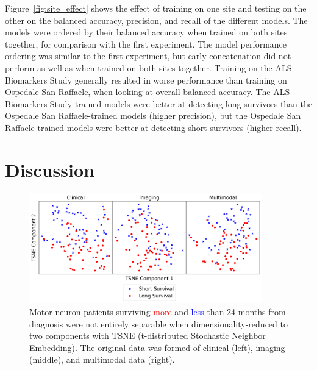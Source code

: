 Figure~\ref{fig:site_effect} shows the effect of training on one site and testing on the other on the balanced accuracy, precision, and recall of the different models.
The models were ordered by their balanced accuracy when trained on both sites together, for comparison with the first experiment.
The model performance ordering was similar to the first experiment, but early concatenation did not perform as well as when trained on both sites together.
Training on the ALS Biomarkers Study generally resulted in worse performance than training on Ospedale San Raffaele, when looking at overall balanced accuracy.
The ALS Biomarkers Study-trained models were better at detecting long survivors than the Ospedale San Raffaele-trained models (higher precision), but the Ospedale San Raffaele-trained models were better at detecting short survivors (higher recall).

\section{Discussion}

\begin{figure}
    \centering
    \includegraphics[width=0.9\textwidth]{figures/tsne_plot}
    \caption[Two-dimensional representation of the separation between long and short surviving motor neuron disease patients with clinical, imaging, and multimodal data.]{Motor neuron patients surviving \textcolor{red}{more} and \textcolor{blue}{less} than 24 months from diagnosis were not entirely separable when dimensionality-reduced to two components with TSNE (t-distributed Stochastic Neighbor Embedding). The original data was formed of clinical (left), imaging (middle), and multimodal data (right).}
    \label{fig:tsne}
\end{figure}

